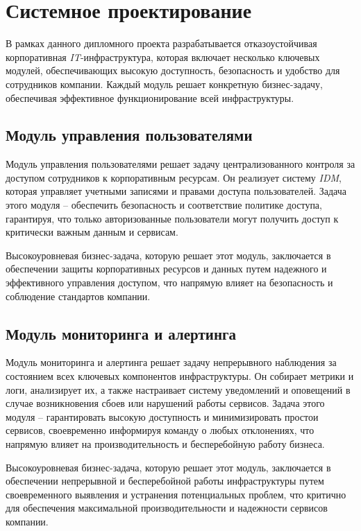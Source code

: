 \section{Системное проектирование}

В рамках данного дипломного проекта разрабатывается отказоустойчивая корпоративная \textit{IT}-инфраструктура, которая включает несколько ключевых модулей, обеспечивающих высокую доступность, безопасность и удобство для сотрудников компании. Каждый модуль решает конкретную бизнес-задачу, обеспечивая эффективное функционирование всей инфраструктуры.

\subsection{Модуль управления пользователями} 
\label{sec:user_management_module}

Модуль управления пользователями решает задачу централизованного контроля за доступом сотрудников к корпоративным ресурсам. Он реализует систему \textit{IDM}, которая управляет учетными записями и правами доступа пользователей. Задача этого модуля -- обеспечить безопасность и соответствие политике доступа, гарантируя, что только авторизованные пользователи могут получить доступ к критически важным данным и сервисам.

Высокоуровневая бизнес-задача, которую решает этот модуль, заключается в обеспечении защиты корпоративных ресурсов и данных путем надежного и эффективного управления доступом, что напрямую влияет на безопасность и соблюдение стандартов компании.

\subsection{Модуль мониторинга и алертинга} 
\label{sec:monitoring_alerting_module}

Модуль мониторинга и алертинга решает задачу непрерывного наблюдения за состоянием всех ключевых компонентов инфраструктуры. Он собирает метрики и логи, анализирует их, а также настраивает систему уведомлений и оповещений в случае возникновения сбоев или нарушений работы сервисов. Задача этого модуля -- гарантировать высокую доступность и минимизировать простои сервисов, своевременно информируя команду о любых отклонениях, что напрямую влияет на производительность и бесперебойную работу бизнеса.

Высокоуровневая бизнес-задача, которую решает этот модуль, заключается в обеспечении непрерывной и бесперебойной работы инфраструктуры путем своевременного выявления и устранения потенциальных проблем, что критично для обеспечения максимальной производительности и надежности сервисов компании.

